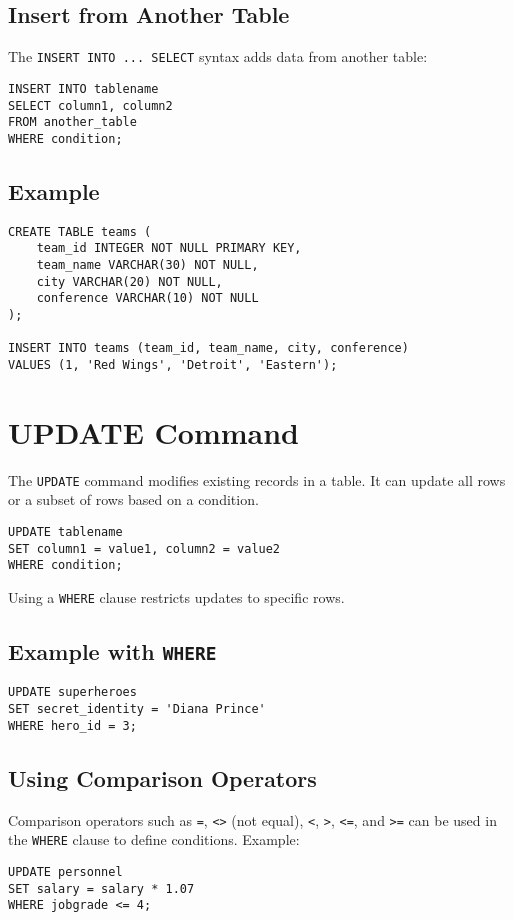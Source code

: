 \documentclass{article}
\begin{document}
\subsection{Insert from Another Table}
The \texttt{INSERT INTO ... SELECT} syntax adds data from another table:
\begin{verbatim}
INSERT INTO tablename
SELECT column1, column2
FROM another_table
WHERE condition;
\end{verbatim}

\subsection{Example}
\begin{verbatim}
CREATE TABLE teams (
    team_id INTEGER NOT NULL PRIMARY KEY,
    team_name VARCHAR(30) NOT NULL,
    city VARCHAR(20) NOT NULL,
    conference VARCHAR(10) NOT NULL
);

INSERT INTO teams (team_id, team_name, city, conference)
VALUES (1, 'Red Wings', 'Detroit', 'Eastern');
\end{verbatim}

\section{UPDATE Command}
The \texttt{UPDATE} command modifies existing records in a table. It can update all rows or a subset of rows based on a condition.
\begin{verbatim}
UPDATE tablename
SET column1 = value1, column2 = value2
WHERE condition;
\end{verbatim}
Using a \texttt{WHERE} clause restricts updates to specific rows.

\subsection{Example with \texttt{WHERE}}
\begin{verbatim}
UPDATE superheroes
SET secret_identity = 'Diana Prince'
WHERE hero_id = 3;
\end{verbatim}

\subsection{Using Comparison Operators}
Comparison operators such as \texttt{=}, \texttt{<>} (not equal), \texttt{<}, \texttt{>}, \texttt{<=}, and \texttt{>=} can be used in the \texttt{WHERE} clause to define conditions. Example:
\begin{verbatim}
UPDATE personnel
SET salary = salary * 1.07
WHERE jobgrade <= 4;
\end{verbatim}
\end{document}
